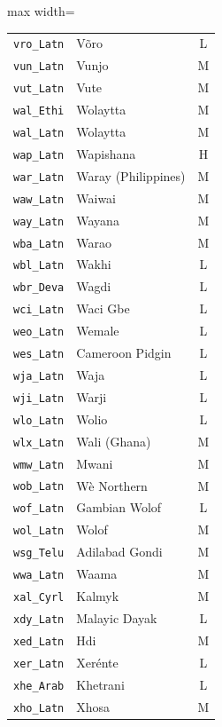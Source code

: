 {\begin{adjustbox}{max width=\textwidth}
\begin{tabular}{llc}
        \texttt{vro\_Latn} & Võro & L \\
        \texttt{vun\_Latn} & Vunjo & M \\
        \texttt{vut\_Latn} & Vute & M \\
        \texttt{wal\_Ethi} & Wolaytta & M \\
        \texttt{wal\_Latn} & Wolaytta & M \\
        \texttt{wap\_Latn} & Wapishana & H \\
        \texttt{war\_Latn} & Waray (Philippines) & M \\
        \texttt{waw\_Latn} & Waiwai & M \\
        \texttt{way\_Latn} & Wayana & M \\
        \texttt{wba\_Latn} & Warao & M \\
        \texttt{wbl\_Latn} & Wakhi & L \\
        \texttt{wbr\_Deva} & Wagdi & L \\
        \texttt{wci\_Latn} & Waci Gbe & L \\
        \texttt{weo\_Latn} & Wemale & L \\
        \texttt{wes\_Latn} & Cameroon Pidgin & L \\
        \texttt{wja\_Latn} & Waja & L \\
        \texttt{wji\_Latn} & Warji & L \\
        \texttt{wlo\_Latn} & Wolio & L \\
        \texttt{wlx\_Latn} & Wali (Ghana) & M \\
        \texttt{wmw\_Latn} & Mwani & M \\
        \texttt{wob\_Latn} & Wè Northern & M \\
        \texttt{wof\_Latn} & Gambian Wolof & L \\
        \texttt{wol\_Latn} & Wolof & M \\
        \texttt{wsg\_Telu} & Adilabad Gondi & M \\
        \texttt{wwa\_Latn} & Waama & M \\
        \texttt{xal\_Cyrl} & Kalmyk & M \\
        \texttt{xdy\_Latn} & Malayic Dayak & L \\
        \texttt{xed\_Latn} & Hdi & M \\
        \texttt{xer\_Latn} & Xerénte & L \\
        \texttt{xhe\_Arab} & Khetrani & L \\
        \texttt{xho\_Latn} & Xhosa & M \\

\end{tabular}
\end{adjustbox}}

